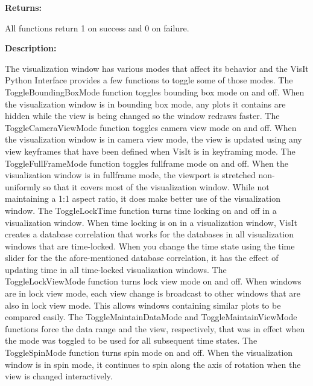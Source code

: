 \documentclass[letterpaper,10pt,english]{sphinxmanual}
\begin{document}
\begin{DUlineblock}{0em}
\item[] 
\item[] \textbf{Returns:}
\item[] All functions return 1 on success and 0 on failure.
\item[] 
\item[] \textbf{Description:}
\item[] The visualization window has various modes that affect its behavior and
the VisIt Python Interface provides a few functions to toggle some of those
modes.
The ToggleBoundingBoxMode function toggles bounding box mode on and off.
When the visualization window is in bounding box mode, any plots it
contains are hidden while the view is being changed so the window redraws
faster.
The ToggleCameraViewMode function toggles camera view mode on and off.
When the visualization window is in camera view mode, the view is updated
using any view keyframes that have been defined when VisIt is in keyframing
mode.
The ToggleFullFrameMode function toggles fullframe mode on and off. When
the visualization window is in fullframe mode, the viewport is stretched
non-uniformly so that it covers most of the visualization window. While not
maintaining a 1:1 aspect ratio, it does make better use of the
visualization window.
The ToggleLockTime function turns time locking on and off in a
visualization window. When time locking is on in a visualization window,
VisIt creates a database correlation that works for the databases in all
visualization windows that are time-locked. When you change the time state
using the time slider for the the afore-mentioned database correlation, it
has the effect of updating time in all time-locked visualization windows.
The ToggleLockViewMode function turns lock view mode on and off. When
windows are in lock view mode, each view change is broadcast to other
windows that are also in lock view mode. This allows windows containing
similar plots to be compared easily.
The ToggleMaintainDataMode and ToggleMaintainViewMode functions force the
data range and the view, respectively, that was in effect when the mode was
toggled to be used for all subsequent time states.
The ToggleSpinMode function turns spin mode on and off. When the
visualization window is in spin mode, it continues to spin along the axis
of rotation when the view is changed interactively.
\end{DUlineblock}

\begin{DUlineblock}{0em}
\item[] 
\end{DUlineblock}
\end{document}
